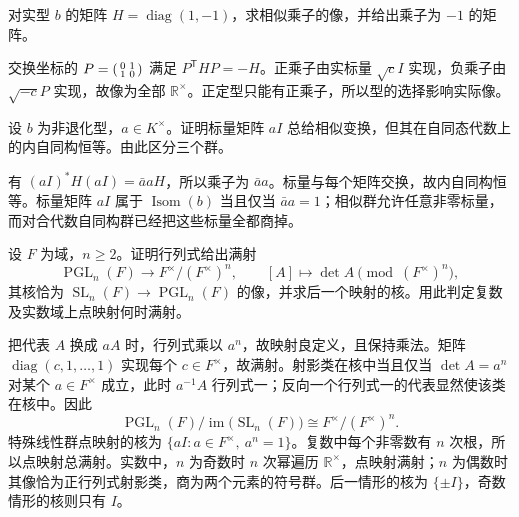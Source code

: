 \begin{optionalexercise}\label{b5:ex:21:17}
	对实型 \(b\) 的矩阵 \(H=\operatorname{diag}(1,-1)\)，求相似乘子的像，并给出乘子为 \(-1\) 的矩阵。
\end{optionalexercise}
\begin{solution}
	交换坐标的 \(P=\begin{psmallmatrix}0&1\\1&0\end{psmallmatrix}\) 满足 \(P^{\mathsf T}HP=-H\)。正乘子由实标量 \(\sqrt c I\) 实现，负乘子由 \(\sqrt{-c}P\) 实现，故像为全部 \(\mathbb R^\times\)。正定型只能有正乘子，所以型的选择影响实际像。
\end{solution}

\begin{optionalexercise}\label{b5:ex:21:18}
	设 \(b\) 为非退化型，\(a\in K^\times\)。证明标量矩阵 \(aI\) 总给相似变换，但其在自同态代数上的内自同构恒等。由此区分三个群。
\end{optionalexercise}
\begin{solution}
	有 \((aI)^*H(aI)=\bar aaH\)，所以乘子为 \(\bar aa\)。标量与每个矩阵交换，故内自同构恒等。标量矩阵 \(aI\) 属于 \(\operatorname{Isom}(b)\) 当且仅当 \(\bar aa=1\)；相似群允许任意非零标量，而对合代数自同构群已经把这些标量全都商掉。
\end{solution}

\begin{optionalexercise}\label{b5:ex:21:19}
	设 \(F\) 为域，\(n\ge2\)。证明行列式给出满射
	\[
		\operatorname{PGL}_n(F)\longrightarrow F^\times/(F^\times)^n, \qquad [A]\longmapsto\det A\pmod{(F^\times)^n},
	\]
	其核恰为 \(\operatorname{SL}_n(F)\to\operatorname{PGL}_n(F)\) 的像，并求后一个映射的核。用此判定复数及实数域上点映射何时满射。
\end{optionalexercise}
\begin{solution}
	把代表 \(A\) 换成 \(aA\) 时，行列式乘以 \(a^n\)，故映射良定义，且保持乘法。矩阵 \(\operatorname{diag}(c,1,\ldots,1)\) 实现每个 \(c\in F^\times\)，故满射。射影类在核中当且仅当 \(\det A=a^n\) 对某个 \(a\in F^\times\) 成立，此时 \(a^{-1}A\) 行列式一；反向一个行列式一的代表显然使该类在核中。因此
	\[
		\operatorname{PGL}_n(F)/\operatorname{im}\bigl(\operatorname{SL}_n(F)\bigr) \cong F^\times/(F^\times)^n.
	\]
	特殊线性群点映射的核为 \(\{aI:a\in F^\times,\ a^n=1\}\)。复数中每个非零数有 \(n\) 次根，所以点映射总满射。实数中，\(n\) 为奇数时 \(n\) 次幂遍历 \(\mathbb R^\times\)，点映射满射；\(n\) 为偶数时其像恰为正行列式射影类，商为两个元素的符号群。后一情形的核为 \(\{\pm I\}\)，奇数情形的核则只有 \(I\)。
\end{solution}

